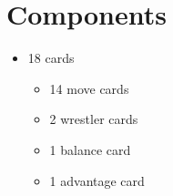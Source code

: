 \section*{Components}
\begin{itemize}[leftmargin=*, nosep]
\item 18 cards
\begin{itemize}[leftmargin=*, nosep]
\item 14 move cards
\item 2 wrestler cards
\item 1 balance card
\item 1 advantage card
\end{itemize}
\end{itemize}

